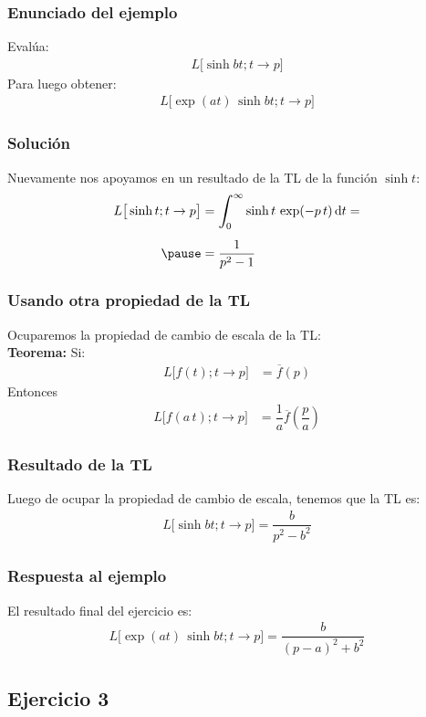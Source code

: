 \documentclass[12pt]{beamer}
\begin{document}
\begin{frame}
\frametitle{Enunciado del ejemplo}
Evalúa:
\pause
\begin{align*}
L \big[ \sinh bt; t \to p \big]
\end{align*}
\pause
Para luego obtener:
\pause
\begin{align*}
L \big[ \exp (a t) \, \sinh bt; t \to p \big]
\end{align*}    
\end{frame}
\begin{frame}
\frametitle{Solución}
Nuevamente nos apoyamos en un resultado de la TL de la función $\sinh t$:
\pause
\begin{eqnarray*}
\begin{aligned}
L \big[ \sinh t ; t \to p \big] &= \scaleint{6ex}_{\bs 0}^{\infty} \sinh t \, \exp(-p \, t) \dd{t} = \\[0.5em] \pause
&= \dfrac{1}{p^{2} - 1}
\end{aligned}
\end{eqnarray*}
\end{frame}
\begin{frame}
\frametitle{Usando otra propiedad de la TL}
Ocuparemos la propiedad de cambio de escala de la TL:
\\
\bigskip
\pause
\noindent \textbf{Teorema: } Si:
\begin{align*}
L \big[f(t); t \to p\big] &= \overline{f} (p)
\end{align*}
Entonces
\begin{align*}
L \big[f(a \, t); t \to p\big] &= \dfrac{1}{a}\overline{f} \left(\dfrac{p}{a}\right)
\end{align*}
\end{frame}
\begin{frame}
\frametitle{Resultado de la TL}
Luego de ocupar la propiedad de cambio de escala, tenemos que la TL es:
\pause
\begin{align*}
L \big[ \sinh b t ; t \to p \big] = \dfrac{b}{p^{2} - b^{2}}
\end{align*}
\end{frame}
\begin{frame}
\frametitle{Respuesta al ejemplo}
El resultado final del ejercicio es:
\pause
\begin{align*}
L \big[ \exp (a t) \, \sinh bt; t \to p \big] = \dfrac{b}{(p - a)^{2} + b^{2}}
\end{align*}
\end{frame}

\subsection{Ejercicio 3}
\end{document}

